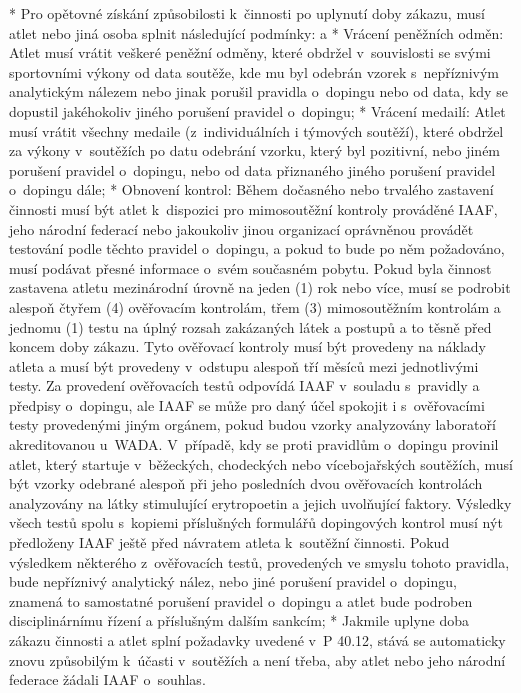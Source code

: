 * Pro opětovné získání způsobilosti k~činnosti po uplynutí doby zákazu, musí atlet nebo jiná osoba splnit následující podmínky:
  \begitems \style a
  * Vrácení peněžních odměn: Atlet musí vrátit veškeré peněžní odměny, které obdržel v~souvislosti se svými sportovními výkony od data soutěže, kde mu byl odebrán vzorek s~nepříznivým analytickým nálezem nebo jinak porušil pravidla o~dopingu nebo od data, kdy se dopustil jakéhokoliv jiného porušení pravidel o~dopingu;
  * Vrácení medailí: Atlet musí vrátit všechny medaile (z~individuálních i týmových soutěží), které obdržel za výkony v~soutěžích po datu odebrání vzorku, který byl pozitivní, nebo jiném porušení pravidel o~dopingu, nebo od data přiznaného jiného porušení pravidel o~dopingu dále;
  * Obnovení kontrol: Během dočasného nebo trvalého zastavení činnosti musí být atlet k~dispozici pro mimosoutěžní kontroly prováděné IAAF, jeho národní federací nebo jakoukoliv jinou organizací oprávněnou provádět testování podle těchto pravidel o~dopingu, a pokud to bude po něm požadováno, musí podávat přesné informace o~svém současném pobytu. Pokud byla činnost zastavena atletu mezinárodní úrovně na jeden (1) rok nebo více, musí se podrobit alespoň čtyřem (4) ověřovacím kontrolám, třem (3) mimosoutěžním kontrolám a jednomu (1) testu na úplný rozsah zakázaných látek a postupů a to těsně před koncem doby zákazu. Tyto ověřovací kontroly musí být provedeny na náklady atleta a musí být provedeny v~odstupu alespoň tří měsíců mezi jednotlivými testy. Za provedení ověřovacích testů odpovídá IAAF v~souladu s~pravidly a předpisy o~dopingu, ale IAAF se může pro daný účel spokojit i s~ověřovacími testy provedenými jiným orgánem, pokud budou vzorky analyzovány laboratoří akreditovanou u~WADA. V~případě, kdy se proti pravidlům o~dopingu provinil atlet, který startuje v~běžeckých, chodeckých nebo vícebojařských soutěžích, musí být vzorky odebrané alespoň při jeho posledních dvou ověřovacích kontrolách analyzovány na látky stimulující erytropoetin a jejich uvolňující faktory. Výsledky všech testů spolu s~kopiemi příslušných formulářů dopingových kontrol musí nýt předloženy IAAF ještě před návratem atleta k~soutěžní činnosti. Pokud výsledkem některého z~ověřovacích testů, provedených ve smyslu tohoto pravidla, bude nepříznivý analytický nález, nebo jiné porušení pravidel o~dopingu, znamená to samostatné porušení pravidel o~dopingu a atlet bude podroben disciplinárnímu řízení a příslušným dalším sankcím;
  * Jakmile uplyne doba zákazu činnosti a atlet splní požadavky uvedené v~P 40.12, stává se automaticky znovu způsobilým k~účasti v~soutěžích a není třeba, aby atlet nebo jeho národní federace žádali IAAF o~souhlas.
  \enditems
\enditems

